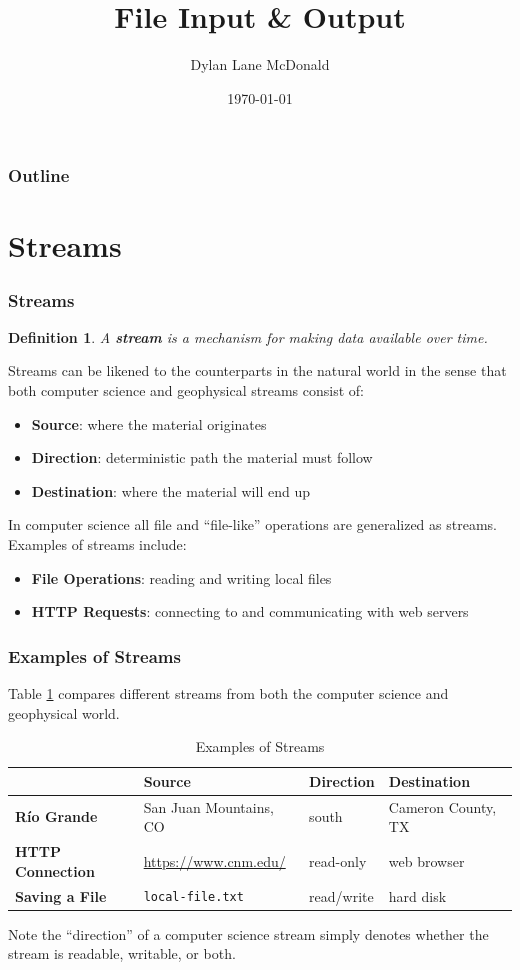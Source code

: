 \documentclass[aspectratio=169]{beamer}
\title{File Input \& Output}
\author{Dylan Lane McDonald}
\institute{CNM STEMulus Center\\Web Development with PHP}
\date{\today}
\newtheorem{defn}{Definition}
\begin{document}
\lstset{language=Java}
\begin{frame}
\titlepage
\end{frame}

\begin{frame}
\frametitle{Outline}
\tableofcontents
\end{frame}

\section{Streams}
\begin{frame}
\frametitle{Streams}
\begin{defn}
A \textbf{stream} is a mechanism for making data available over time.
\end{defn}
Streams can be likened to the counterparts in the natural world in the sense that both computer science and geophysical streams consist of:
\begin{itemize}
	\item \textbf{Source}: where the material originates
	\item \textbf{Direction}: deterministic path the material must follow
	\item \textbf{Destination}: where the material will end up
\end{itemize}
In computer science all file and ``file-like'' operations are generalized as streams. Examples of streams include:
\begin{itemize}
	\item \textbf{File Operations}: reading and writing local files
	\item \textbf{HTTP Requests}: connecting to and communicating with web servers
\end{itemize}
\end{frame}

\begin{frame}
\frametitle{Examples of Streams}
Table \ref{tbl:streams} compares different streams from both the computer science and geophysical world.
\begin{table}
\begin{tabular}{|l|l|l|l|}
\hline
& \textbf{Source} & \textbf{Direction} & \textbf{Destination}\\
\hline
\textbf{R\'{i}o Grande} & San Juan Mountains, CO & south & Cameron County, TX\\
\hline
\textbf{HTTP Connection} & \url{https://www.cnm.edu/} & read-only & web browser\\
\hline
\textbf{Saving a File} & \texttt{local-file.txt} & read/write & hard disk\\
\hline
\end{tabular}
\caption{Examples of Streams}
\label{tbl:streams}
\end{table}

Note the ``direction'' of a computer science stream simply denotes whether the stream is readable, writable, or both.
\end{frame}
\end{document}
